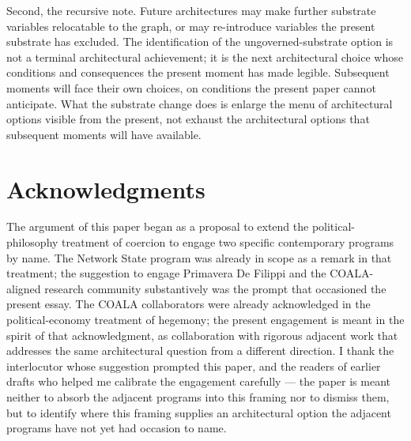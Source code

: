 \documentclass[11pt,a4paper]{article}
\theoremstyle{remark}
\begin{document}
Second, the recursive note. Future architectures may make
further substrate variables relocatable to the graph, or may
re-introduce variables the present substrate has excluded. The
identification of the ungoverned-substrate option is not a
terminal architectural achievement; it is the next architectural
choice whose conditions and consequences the present moment has
made legible. Subsequent moments will face their own choices,
on conditions the present paper cannot anticipate. What the
substrate change does is enlarge the menu of architectural
options visible from the present, not exhaust the architectural
options that subsequent moments will have available.

\section*{Acknowledgments}
The argument of this paper began as a proposal to extend the
political-philosophy treatment of coercion to engage two
specific contemporary programs by name. The Network State
program was already in scope as a remark in that treatment; the
suggestion to engage Primavera De Filippi and the COALA-aligned
research community substantively was the prompt that occasioned
the present essay. The COALA collaborators were already
acknowledged in the political-economy treatment of hegemony;
the present engagement is meant in the spirit of that
acknowledgment, as collaboration with rigorous adjacent work
that addresses the same architectural question from a different
direction. I thank the interlocutor whose suggestion prompted
this paper, and the readers of earlier drafts who helped me
calibrate the engagement carefully --- the paper is meant
neither to absorb the adjacent programs into this framing nor to
dismiss them, but to identify where this framing supplies an
architectural option the adjacent programs have not yet had
occasion to name.


\end{document}

